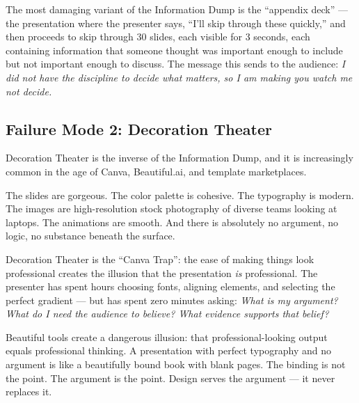 The most damaging variant of the Information Dump is the ``appendix deck'' --- the presentation where the presenter says, ``I'll skip through these quickly,'' and then proceeds to skip through 30 slides, each visible for 3 seconds, each containing information that someone thought was important enough to include but not important enough to discuss. The message this sends to the audience: \emph{I did not have the discipline to decide what matters, so I am making you watch me not decide.}


\subsection{Failure Mode 2: Decoration Theater}

Decoration Theater is the inverse of the Information Dump, and it is increasingly common in the age of Canva, Beautiful.ai, and template marketplaces.

The slides are gorgeous. The color palette is cohesive. The typography is modern. The images are high-resolution stock photography of diverse teams looking at laptops. The animations are smooth. And there is absolutely no argument, no logic, no substance beneath the surface.

Decoration Theater is the ``Canva Trap'': the ease of making things look professional creates the illusion that the presentation \emph{is} professional. The presenter has spent hours choosing fonts, aligning elements, and selecting the perfect gradient --- but has spent zero minutes asking: \emph{What is my argument? What do I need the audience to believe? What evidence supports that belief?}

\begin{insightbox}
Beautiful tools create a dangerous illusion: that professional-looking output equals professional thinking. A presentation with perfect typography and no argument is like a beautifully bound book with blank pages. The binding is not the point. The argument is the point. Design serves the argument --- it never replaces it.
\end{insightbox}

